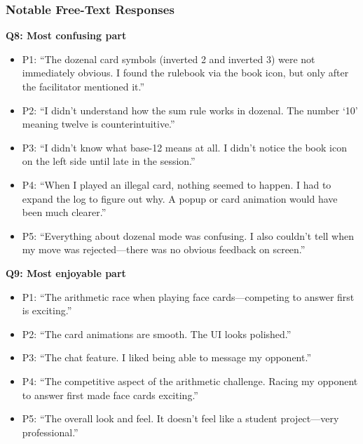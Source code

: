 \documentclass[12pt, titlepage]{article}
\begin{document}
\subsubsection{Notable Free-Text Responses}

\noindent\textbf{Q8: Most confusing part}
\begin{itemize}
  \item P1: ``The dozenal card symbols (inverted 2 and inverted 3) were not immediately obvious. I found the rulebook via the book icon, but only after the facilitator mentioned it.''
  \item P2: ``I didn't understand how the sum rule works in dozenal. The number `10' meaning twelve is counterintuitive.''
  \item P3: ``I didn't know what base-12 means at all. I didn't notice the book icon on the left side until late in the session.''
  \item P4: ``When I played an illegal card, nothing seemed to happen. I had to expand the log to figure out why. A popup or card animation would have been much clearer.''
  \item P5: ``Everything about dozenal mode was confusing. I also couldn't tell when my move was rejected---there was no obvious feedback on screen.''
\end{itemize}

\noindent\textbf{Q9: Most enjoyable part}
\begin{itemize}
  \item P1: ``The arithmetic race when playing face cards---competing to answer first is exciting.''
  \item P2: ``The card animations are smooth. The UI looks polished.''
  \item P3: ``The chat feature. I liked being able to message my opponent.''
  \item P4: ``The competitive aspect of the arithmetic challenge. Racing my opponent to answer first made face cards exciting.''
  \item P5: ``The overall look and feel. It doesn't feel like a student project---very professional.''
\end{itemize}
\end{document}
